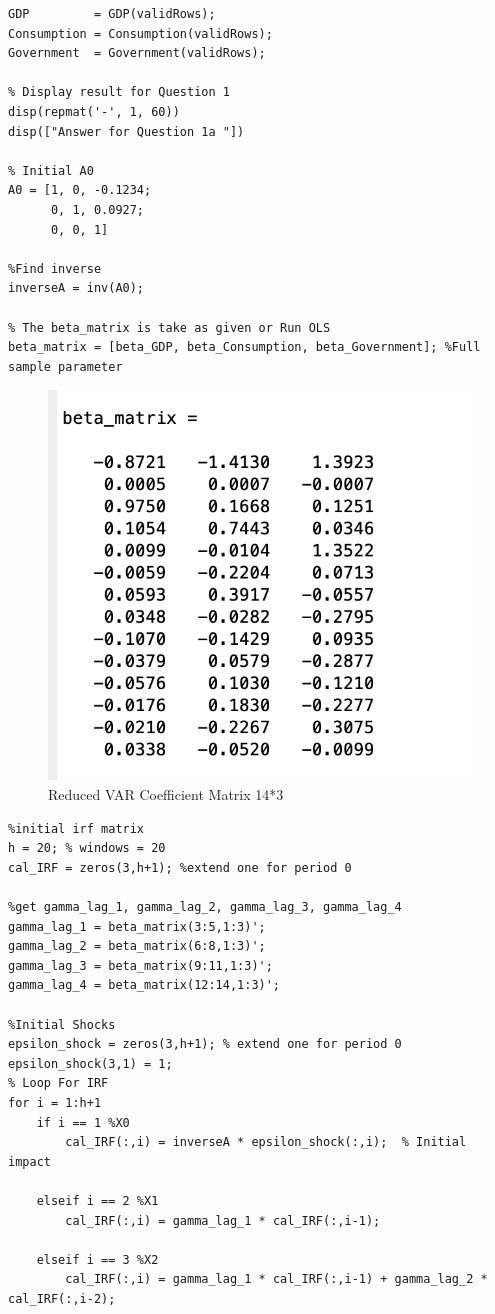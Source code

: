 \documentclass{article}
\begin{document}
\begin{CJK}{UTF8}{gbsn}
\begin{lstlisting}
GDP         = GDP(validRows);
Consumption = Consumption(validRows);
Government  = Government(validRows);

% Display result for Question 1
disp(repmat('-', 1, 60))
disp(["Answer for Question 1a "])
 
% Initial A0 
A0 = [1, 0, -0.1234; 
      0, 1, 0.0927;
      0, 0, 1]

%Find inverse 
inverseA = inv(A0); 

% The beta_matrix is take as given or Run OLS 
beta_matrix = [beta_GDP, beta_Consumption, beta_Government]; %Full sample parameter 
\end{lstlisting}

\begin{figure}[!h]
    \centering
    \includegraphics[width=0.5\linewidth]{Reduced VAR Coefficient Matrix .png}
    \caption{Reduced VAR Coefficient Matrix 14*3}
    \label{fig:enter-label}
\end{figure}

\begin{lstlisting}
%initial irf matrix 
h = 20; % windows = 20 
cal_IRF = zeros(3,h+1); %extend one for period 0

%get gamma_lag_1, gamma_lag_2, gamma_lag_3, gamma_lag_4
gamma_lag_1 = beta_matrix(3:5,1:3)';
gamma_lag_2 = beta_matrix(6:8,1:3)';
gamma_lag_3 = beta_matrix(9:11,1:3)';
gamma_lag_4 = beta_matrix(12:14,1:3)';

%Initial Shocks
epsilon_shock = zeros(3,h+1); % extend one for period 0
epsilon_shock(3,1) = 1;
% Loop For IRF 
for i = 1:h+1  
    if i == 1 %X0
        cal_IRF(:,i) = inverseA * epsilon_shock(:,i);  % Initial impact
    
    elseif i == 2 %X1
        cal_IRF(:,i) = gamma_lag_1 * cal_IRF(:,i-1);
    
    elseif i == 3 %X2
        cal_IRF(:,i) = gamma_lag_1 * cal_IRF(:,i-1) + gamma_lag_2 * cal_IRF(:,i-2);
    

\end{lstlisting}
\end{CJK}
\end{document}

